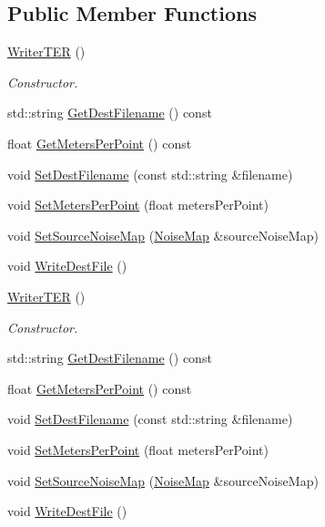 \subsection*{Public Member Functions}
\begin{DoxyCompactItemize}
\item 
\hyperlink{classnoise_1_1utils_1_1_writer_t_e_r_a6504f93a224b3c91ff67ffee09824fe2}{Writer\+T\+E\+R} ()
\begin{DoxyCompactList}\small\item\em Constructor. \end{DoxyCompactList}\item 
std\+::string \hyperlink{classnoise_1_1utils_1_1_writer_t_e_r_a6cbb6d1ef375ab37fa275a8035c5f28e}{Get\+Dest\+Filename} () const 
\item 
float \hyperlink{classnoise_1_1utils_1_1_writer_t_e_r_a320c265c66960fad0a421f0deced0860}{Get\+Meters\+Per\+Point} () const 
\item 
void \hyperlink{classnoise_1_1utils_1_1_writer_t_e_r_af8db9e0a480658949ba8d37f4cb03368}{Set\+Dest\+Filename} (const std\+::string \&filename)
\item 
void \hyperlink{classnoise_1_1utils_1_1_writer_t_e_r_a77f53ea49305858a04ee3cac14d119ec}{Set\+Meters\+Per\+Point} (float meters\+Per\+Point)
\item 
void \hyperlink{classnoise_1_1utils_1_1_writer_t_e_r_a26314e0c188948fa01200a54189c28ca}{Set\+Source\+Noise\+Map} (\hyperlink{classnoise_1_1utils_1_1_noise_map}{Noise\+Map} \&source\+Noise\+Map)
\item 
void \hyperlink{classnoise_1_1utils_1_1_writer_t_e_r_ad4332c36a48cb32bef6798def109052e}{Write\+Dest\+File} ()
\item 
\hyperlink{classnoise_1_1utils_1_1_writer_t_e_r_a6504f93a224b3c91ff67ffee09824fe2}{Writer\+T\+E\+R} ()
\begin{DoxyCompactList}\small\item\em Constructor. \end{DoxyCompactList}\item 
std\+::string \hyperlink{classnoise_1_1utils_1_1_writer_t_e_r_a6cbb6d1ef375ab37fa275a8035c5f28e}{Get\+Dest\+Filename} () const 
\item 
float \hyperlink{classnoise_1_1utils_1_1_writer_t_e_r_a320c265c66960fad0a421f0deced0860}{Get\+Meters\+Per\+Point} () const 
\item 
void \hyperlink{classnoise_1_1utils_1_1_writer_t_e_r_af8db9e0a480658949ba8d37f4cb03368}{Set\+Dest\+Filename} (const std\+::string \&filename)
\item 
void \hyperlink{classnoise_1_1utils_1_1_writer_t_e_r_a77f53ea49305858a04ee3cac14d119ec}{Set\+Meters\+Per\+Point} (float meters\+Per\+Point)
\item 
void \hyperlink{classnoise_1_1utils_1_1_writer_t_e_r_a26314e0c188948fa01200a54189c28ca}{Set\+Source\+Noise\+Map} (\hyperlink{classnoise_1_1utils_1_1_noise_map}{Noise\+Map} \&source\+Noise\+Map)
\item 
void \hyperlink{classnoise_1_1utils_1_1_writer_t_e_r_a35a50366223e5f0a18c471099d593a32}{Write\+Dest\+File} ()
\end{DoxyCompactItemize}
